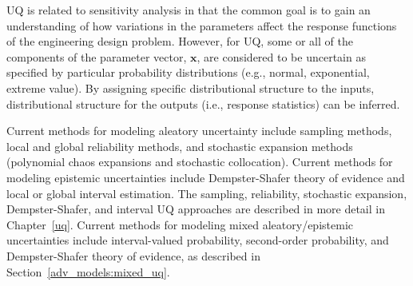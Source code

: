 UQ is related to sensitivity analysis in that the common goal is to
gain an understanding of how variations in the parameters affect the
response functions of the engineering design problem. However, for UQ,
some or all of the components of the parameter vector, $\mathbf{x}$,
are considered to be uncertain as specified by particular probability
distributions (e.g., normal, exponential, extreme value).  By
assigning specific distributional structure to the inputs,
distributional structure for the outputs (i.e., response statistics)
can be inferred.

Current methods for modeling aleatory uncertainty include sampling
methods, local and global reliability methods, and stochastic
expansion methods (polynomial chaos expansions and stochastic
collocation).  Current methods for modeling epistemic uncertainties
include Dempster-Shafer theory of evidence and local or global
interval estimation.  The sampling, reliability, stochastic expansion,
Dempster-Shafer, and interval UQ approaches are described in more
detail in Chapter~\ref{uq}.  Current methods for modeling mixed
aleatory/epistemic uncertainties include interval-valued probability,
second-order probability, and Dempster-Shafer theory of evidence, as
described in Section~\ref{adv_models:mixed_uq}.


